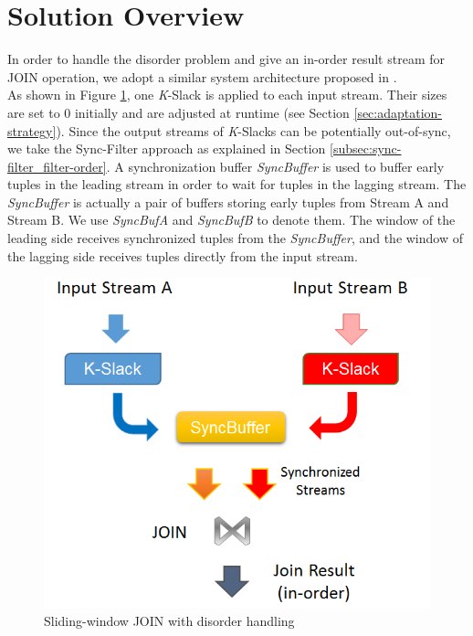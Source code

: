 \documentclass[a4paper, 11pt, twoside]{report}
\begin{document}
\section{Solution Overview}
\label{sec:solution-overview}

In order to handle the disorder problem and give an in-order result stream for JOIN operation, we adopt a similar system architecture proposed in \cite{wu2007window}.\\

As shown in Figure \ref{fig:system_arch}, one \textit{K}-Slack is applied to each input stream. Their sizes are set to 0 initially and are adjusted at runtime (see Section \ref{sec:adaptation-strategy}). Since the output streams of \textit{K}-Slacks can be potentially out-of-sync, we take the Sync-Filter approach as explained in Section \ref{subsec:sync-filter_filter-order}. A synchronization buffer \textit{SyncBuffer} is used to buffer early tuples in the leading stream in order to wait for tuples in the lagging stream. The \textit{SyncBuffer} is actually a pair of buffers storing early tuples from Stream A and Stream B. We use \textit{SyncBufA} and \textit{SyncBufB} to denote them. The window of the leading side receives synchronized tuples from the \textit{SyncBuffer}, and the window of the lagging side receives tuples directly from the input stream. \\

%
%

\begin{figure}[h]
\centering
\includegraphics[scale=0.6]{architecture}
\caption{Sliding-window JOIN with disorder handling \label{fig:system_arch}}
\end{figure}
\end{document}
